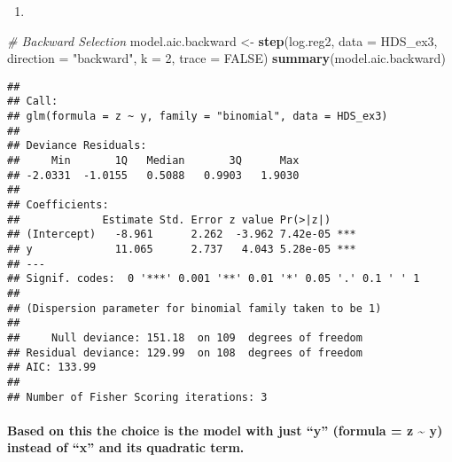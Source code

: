 \documentclass[]{article}
\newenvironment{Shaded}{\begin{snugshade}}{\end{snugshade}}
\newcommand{\CommentTok}[1]{\textcolor[rgb]{0.56,0.35,0.01}{\textit{#1}}}
\newcommand{\DataTypeTok}[1]{\textcolor[rgb]{0.13,0.29,0.53}{#1}}
\newcommand{\DecValTok}[1]{\textcolor[rgb]{0.00,0.00,0.81}{#1}}
\newcommand{\KeywordTok}[1]{\textcolor[rgb]{0.13,0.29,0.53}{\textbf{#1}}}
\newcommand{\NormalTok}[1]{#1}
\newcommand{\OtherTok}[1]{\textcolor[rgb]{0.56,0.35,0.01}{#1}}
\newcommand{\StringTok}[1]{\textcolor[rgb]{0.31,0.60,0.02}{#1}}
\let\oldparagraph\paragraph
\renewcommand{\paragraph}[1]{\oldparagraph{#1}\mbox{}}
\begin{document}
\begin{enumerate}
\def\labelenumi{(\alph{enumi})}
\setcounter{enumi}{2}
\item
\end{enumerate}

\begin{Shaded}
\begin{Highlighting}[]
\CommentTok{# Backward Selection}
\NormalTok{model.aic.backward <-}\StringTok{ }\KeywordTok{step}\NormalTok{(log.reg2,  }\DataTypeTok{data =}\NormalTok{ HDS_ex3, }\DataTypeTok{direction =} \StringTok{"backward"}\NormalTok{, }\DataTypeTok{k =} \DecValTok{2}\NormalTok{, }\DataTypeTok{trace =} \OtherTok{FALSE}\NormalTok{)}
\KeywordTok{summary}\NormalTok{(model.aic.backward)}
\end{Highlighting}
\end{Shaded}

\begin{verbatim}
## 
## Call:
## glm(formula = z ~ y, family = "binomial", data = HDS_ex3)
## 
## Deviance Residuals: 
##     Min       1Q   Median       3Q      Max  
## -2.0331  -1.0155   0.5088   0.9903   1.9030  
## 
## Coefficients:
##             Estimate Std. Error z value Pr(>|z|)    
## (Intercept)   -8.961      2.262  -3.962 7.42e-05 ***
## y             11.065      2.737   4.043 5.28e-05 ***
## ---
## Signif. codes:  0 '***' 0.001 '**' 0.01 '*' 0.05 '.' 0.1 ' ' 1
## 
## (Dispersion parameter for binomial family taken to be 1)
## 
##     Null deviance: 151.18  on 109  degrees of freedom
## Residual deviance: 129.99  on 108  degrees of freedom
## AIC: 133.99
## 
## Number of Fisher Scoring iterations: 3
\end{verbatim}

\hypertarget{based-on-this-the-choice-is-the-model-with-just-y-formula-z-y-instead-of-x-and-its-quadratic-term.}{%
\paragraph{Based on this the choice is the model with just ``y''
(formula = z \textasciitilde{} y) instead of ``x'' and its quadratic
term.}\label{based-on-this-the-choice-is-the-model-with-just-y-formula-z-y-instead-of-x-and-its-quadratic-term.}}
\end{document}
